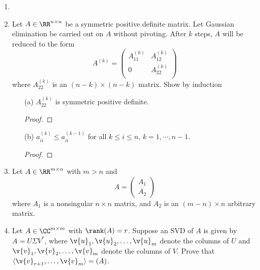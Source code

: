 \documentclass[11pt]{article}
\begin{document}
\begin{enumerate}
        \begin{proof}
            
        \end{proof}

    \item %

    \item %
        Let $A \in \RR^{n \times n}$ be a symmetric positive definite matrix.
        Let Gaussian elimination be carried out on $A$ without pivoting.
        After $k$ steps, $A$ will be reduced to the form
        \[
            A^{(k)} =
            \begin{pmatrix}
                A_{11}^{(k)} & A_{12}^{(k)} \\
                0            & A_{22}^{(k)} \\
            \end{pmatrix}
        \]
        where $A_{22}^{(k)}$ is an $(n - k) \times (n - k)$ matrix.
        Show by induction
        \begin{enumerate}
            \item[(a)]
                $A_{22}^{(k)}$ is symmetric positive definite.

                \begin{proof}
                    
                \end{proof}

            \item[(b)]
                $a_{ii}^{(k)} \le a_{ii}^{(k-1)}$ for all $k \le i \le n$,
                $k = 1, \cdots, n - 1$.

                \begin{proof}
                    
                \end{proof}
        \end{enumerate}

    \item %
        Let $A \in \RR^{m \times n}$ with $m > n$ and
        \[
            A = 
            \begin{pmatrix}
                A_1 \\
                A_2
            \end{pmatrix}
        \]
        where $A_1$ is a nonsingular $n \times n$ matrix, and $A_2$ is an
        $(m - n) \times n$ arbitrary matrix.

    \item %
        Let $A \in \CC^{m \times m}$ with $\rank(A) = r$.
        Suppose an SVD of $A$ is given by $A = U\Sigma V^*$, where
        $\v{u}_1, \v{u}_2, \ldots, \v{u}_m$ denote the columns of $U$ and
        $\v{v}_1, \v{v}_2, \ldots, \v{v}_m$ denote the columns of $V$.
        Prove that $\langle\v{v}_{r+1}, \ldots, \v{v}_m\rangle = \null(A)$.


\end{enumerate}
\end{document}
